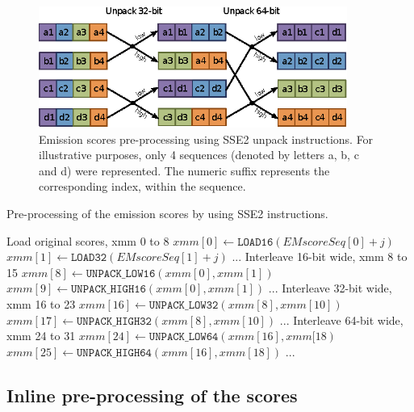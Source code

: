 \documentclass{bmcart}
\begin{document}
\begin{figure}[!b]
  \centering
  \includegraphics[width=0.9\textwidth]{img/scores-loading-rognes.eps}
  \caption{Emission scores pre-processing using SSE2 unpack instructions. For illustrative purposes, only 4 sequences (denoted by letters \textsf{a}, \textsf{b}, \textsf{c} and \textsf{d}) were represented. The numeric suffix represents the corresponding index, within the sequence.}
  \label{scores-loading-rognes}
\end{figure}

\begin{algorithm}[!t]
\caption{Pre-processing of the emission scores by using SSE2 instructions.}
\label{scores_pre_processing}
\begin{algorithmic}
  \LeftComment Load original scores, xmm 0 to 8
  \State $xmm[0] \gets \mathtt{LOAD16}(\mathit{EMscoreSeq}[0]+j) $
  \State $xmm[1] \gets \mathtt{LOAD32}(\mathit{EMscoreSeq}[1]+j) $
  \State ...
  \LeftComment Interleave 16-bit wide, xmm 8 to 15
  \State $xmm[8] \gets \mathtt{UNPACK\_LOW16}(xmm[0], xmm[1]) $
  \State $xmm[9] \gets \mathtt{UNPACK\_HIGH16}(xmm[0], xmm[1]) $
  \State ...
  \LeftComment Interleave 32-bit wide, xmm 16 to 23
  \State $xmm[16] \gets \mathtt{UNPACK\_LOW32}(xmm[8], xmm[10]) $
  \State $xmm[17] \gets \mathtt{UNPACK\_HIGH32}(xmm[8], xmm[10]) $
  \State ...
  \LeftComment Interleave 64-bit wide, xmm 24 to 31
  \State $xmm[24] \gets \mathtt{UNPACK\_LOW64}(xmm[16], xmm[18) $
  \State $xmm[25] \gets \mathtt{UNPACK\_HIGH64}(xmm[16], xmm[18]) $
  \State ...
\EndProcedure
\end{algorithmic}
\end{algorithm}

\subsection*{Inline pre-processing of the scores}
\end{document}
